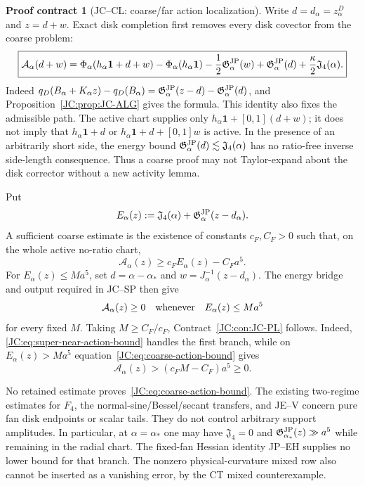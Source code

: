 \documentclass[11pt]{amsart}
\providecommand{\mathscr}{\mathcal}
\numberwithin{equation}{section}
\theoremstyle{definition}
\newtheorem{contract}[theorem]{Proof contract}
\theoremstyle{remark}
\newcommand{\Jfour}{\mathfrak J_4}
\newcommand{\Gjp}{\mathfrak G^{\rm JP}}
\providecommand{\mathscr}[1]{\mathcal{#1}}
\begin{document}
\begin{contract}[JC--CL: coarse/far action localization]
\label{JC:con:JC-CL}
Write $d=d_\alpha=z_\alpha^D$ and $z=d+w$.  Exact disk completion first
removes every disk covector from the coarse problem:
\begin{equation}\label{JC:eq:coarse-action-normal-form}
 \boxed{
 \mathscr A_\alpha(d+w)=
 \Phi_\alpha(h_\alpha\mathbf1+d+w)
 -\Phi_\alpha(h_\alpha\mathbf1)
 -\frac12\Gjp_\alpha(w)+\Gjp_\alpha(d)
 +\frac\kappa2\Jfour(\alpha).}
\end{equation}
Indeed
$q_D(B_\alpha+K_\alpha z)-q_D(B_\alpha)
=\Gjp_\alpha(z-d)-\Gjp_\alpha(d)$, and
Proposition~\ref{JC:prop:JC-ALG} gives the formula.  This identity also fixes
the admissible path.  The active chart supplies only
$h_\alpha\mathbf1+[0,1](d+w)$; it does not imply that
$h_\alpha\mathbf1+d$ or
$h_\alpha\mathbf1+d+[0,1]w$ is active.  In the presence of an arbitrarily
short side, the energy bound $\Gjp_\alpha(d)\lesssim\Jfour(\alpha)$ has no
ratio-free inverse side-length consequence.  Thus a coarse proof may not
Taylor-expand about the disk corrector without a new activity lemma.

Put
\begin{equation}\label{JC:eq:coarse-action-energy}
 E_\alpha(z):=\Jfour(\alpha)
 +\Gjp_\alpha(z-d_\alpha).
\end{equation}
A sufficient coarse estimate is the existence of constants
$c_F,C_F>0$ such that, on the whole active no-ratio chart,
\begin{equation}\label{JC:eq:coarse-action-bound}
 \boxed{
 \mathscr A_\alpha(z)
 \ge c_FE_\alpha(z)-C_Fa^5.}
\end{equation}
For $E_\alpha(z)\le Ma^5$, set
$d=\alpha-\alpha_*$ and
$w=J_\alpha^{-1}(z-d_\alpha)$.  The energy bridge and output required in
JC--SP then give
\begin{equation}\label{JC:eq:super-near-action-bound}
 \mathscr A_\alpha(z)\ge0
 \quad\hbox{whenever}\quad
 E_\alpha(z)\le Ma^5
\end{equation}
for every fixed $M$.  Taking $M\ge C_F/c_F$, Contract~\ref{JC:con:JC-PL}
follows.  Indeed,
\eqref{JC:eq:super-near-action-bound} handles the first branch, while on
$E_\alpha(z)>Ma^5$ equation~\eqref{JC:eq:coarse-action-bound} gives
\[
 \mathscr A_\alpha(z)
 >(c_FM-C_F)a^5\ge0.
\]

No retained estimate proves~\eqref{JC:eq:coarse-action-bound}.  The existing
two-regime estimates for $F_4$, the normal-sine/Bessel/secant transfers,
and JE--V concern pure fan disk endpoints or scalar tails.  They do not
control arbitrary support amplitudes.  In particular, at
$\alpha=\alpha_*$ one may have
$\Jfour=0$ and $\Gjp_{\alpha_*}(z)\gg a^5$ while remaining in the radial
chart.  The fixed-fan Hessian identity JP--EH supplies no lower bound for
that branch.  The nonzero physical-curvature mixed row also cannot be
inserted as a vanishing error, by the CT mixed counterexample.


\end{contract}
\end{document}
